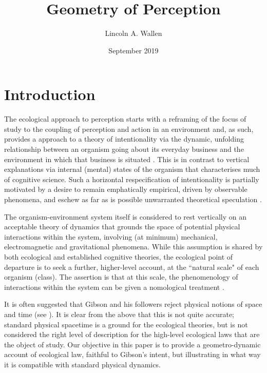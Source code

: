 \documentclass[a4paper]{article}
\title{Geometry of Perception}
\author{Lincoln A. Wallen }
\date{September 2019}
\begin{document}
\maketitle

\section{Introduction}
The ecological approach to perception starts with a reframing of the focus of study to the coupling of perception and action in an environment and, as such, provides a approach to a theory of intentionality via the dynamic, unfolding relationship between an organism going about its everyday business and the environment in which that business is situated \cite{Gibson1979}.  This is in contrast to vertical explanations via internal (mental) states of the organism that characterises much of cognitive science.  Such a horizontal respecification of intentionality is partially motivated by a desire to remain emphatically empirical, driven by observable phenomena, and eschew as far as is possible unwarranted theoretical speculation \cite{VanDijk2014}.

The organism-environment system itself is considered to rest vertically on an acceptable theory of dynamics that grounds the space of potential physical interactions within the system, involving (at minimum) mechanical, electromagnetic and gravitational phenomena.  While this assumption is shared by both ecological and established cognitive theories, the ecological point of departure is to seek a further, higher-level account, at the “natural scale" of each organism (class).  The assertion is that at this scale, the phenomenology of interactions within the system can be given a nomological treatment \cite{Mace2005}.

It is often suggested that Gibson and his followers reject physical notions of space and time (see \cite{Mace2005}).  It is clear from the above that this is not quite accurate; standard physical spacetime is a ground for the ecological theories, but is not considered the right level of description for the high-level ecological laws that are the object of study.  Our objective in this paper is to provide a geometro-dynamic account of ecological law, faithful to Gibson’s intent, but illustrating in what way it is compatible with standard physical dynamics. 



\end{document}
